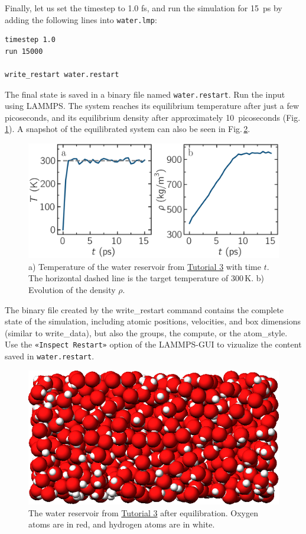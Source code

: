 \documentclass[9pt,tutorial]{livecoms}
\newcommand{\lmpcmdnote}[1]{\hspace{0pt}\colorbox{note_listing}{\textcolor{command}{\small{#1}}}\hspace{0pt}} %
\newcommand{\flecmd}[1]{\textcolor{command}{\texttt{#1}}} %
\newcommand{\guicmd}[1]{\textcolor{command}{\texttt{«#1»}}} %
\begin{document}
Finally, let us set the timestep to 1.0 fs, and run the simulation for 15~ps by
adding the following lines into \flecmd{water.lmp}:
\begin{lstlisting}
timestep 1.0
run 15000

write_restart water.restart
\end{lstlisting}
The final state is saved in a binary file named \flecmd{water.restart}.
Run the input using LAMMPS.  The system reaches its equilibrium temperature
after just a few picoseconds, and its equilibrium density after approximately
10~picoseconds (Fig.\,\ref{fig:PEG-density}).  A snapshot of the equilibrated
system can also be seen in Fig.\,\ref{fig:PEG-water}.

\begin{figure}
\centering
\includegraphics[width=\linewidth]{PEG-density}
\caption{a) Temperature of the water reservoir from
\hyperref[all-atom-label]{Tutorial 3} with time $t$.  The horizontal dashed line is
the target temperature of 300\,K.  b) Evolution of the density $\rho$.}
\label{fig:PEG-density}
\end{figure}

\begin{note}
The binary file created by the \lmpcmdnote{write\_restart} command contains the
complete state of the simulation, including atomic positions, velocities, and
box dimensions (similar to \lmpcmdnote{write\_data}), but also the groups,
the compute, or the \lmpcmdnote{atom\_style}.  Use the \guicmd{Inspect Restart}
option of the LAMMPS-GUI to vizualize the content saved in \flecmd{water.restart}.
\end{note}

\begin{figure}
\centering
\includegraphics[width=\linewidth]{PEG-water}
\caption{The water reservoir from \hyperref[all-atom-label]{Tutorial 3}
after equilibration.  Oxygen atoms are in red, and hydrogen atoms are in white.}
\label{fig:PEG-water}
\end{figure}
\end{document}
